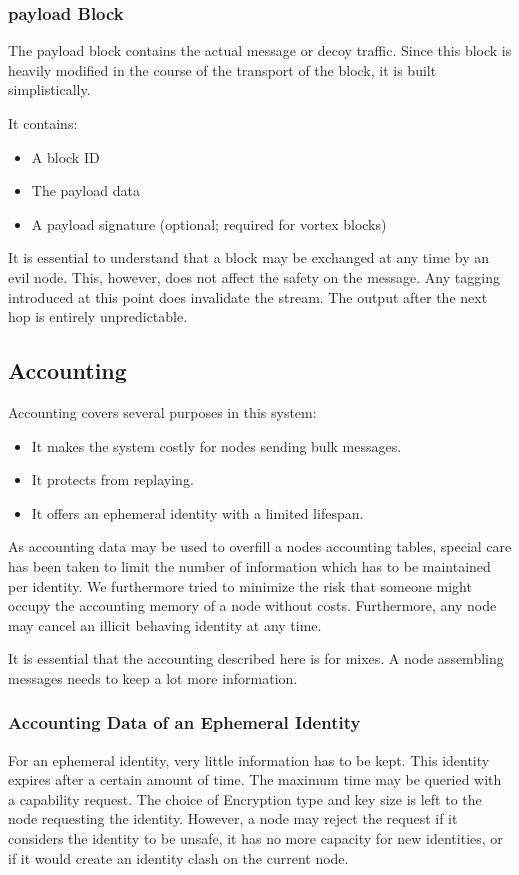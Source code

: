 \subsubsection{payload Block}
The payload block contains the actual message or decoy traffic. Since this block is heavily modified in the course of the transport of the block, it is built simplistically.

It contains:
\begin{itemize}
	\item A block ID
	\item The payload data
	\item A payload signature (optional; required for vortex blocks)
\end{itemize}

It is essential to understand that a block may be exchanged at any time by an evil node. This, however, does not affect the safety on the message. Any tagging introduced at this point does invalidate the stream. The output after the next hop is entirely unpredictable.

\subsection{Accounting\label{sec:accounting}}
Accounting covers several purposes in this system:
\begin{itemize}
	\item It makes the system costly for nodes sending bulk messages.
	\item It protects from replaying.
	\item It offers an ephemeral identity with a limited lifespan.
\end{itemize}

As accounting data may be used to overfill a nodes accounting tables, special care has been taken to limit the number of information which has to be maintained per identity. We furthermore tried to minimize the risk that someone might occupy the accounting memory of a node without costs. Furthermore, any node may cancel an illicit behaving identity at any time.

It is essential that the accounting described here is for mixes. A node assembling messages needs to keep a lot more information.

\subsubsection{Accounting Data of an Ephemeral Identity}
For an ephemeral identity, very little information has to be kept. This identity expires after a certain amount of time. The maximum time may be queried with a capability request. The choice of Encryption type and key size is left to the node requesting the identity. However, a node may reject the request if it considers the identity to be unsafe, it has no more capacity for new identities, or if it would create an identity clash on the current node.


